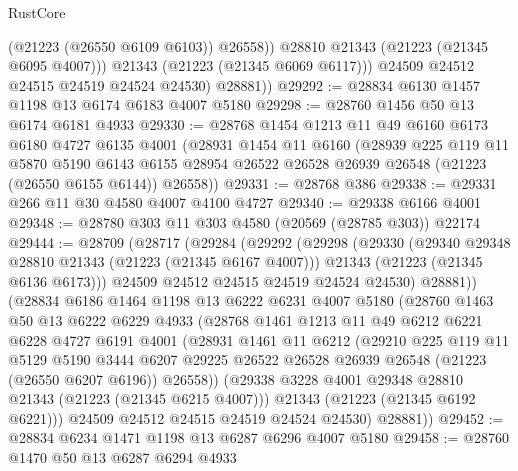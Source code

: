 \begin{lexlean}{RustCore}
\begin{coremodule}
                  (@21223 (@26550 @6109 @6103))
                  @26558))
              @28810
              @21343
              (@21223 (@21345 @6095 @4007)))
            @21343
            (@21223 (@21345 @6069 @6117)))
          @24509
          @24512
          @24515
          @24519
          @24524
          @24530)
        @28881))
@29292 := @28834 @6130 @1457 @1198 @13 @6174 @6183 @4007 @5180
@29298 := @28760 @1456 @50 @13 @6174 @6181 @4933
@29330 := @28768
    @1454
    @1213
    @11
    @49
    @6160
    @6173
    @6180
    @4727
    @6135
    @4001
    (@28931
      @1454
      @11
      @6160
      (@28939
        @225
        @119
        @11
        @5870
        @5190
        @6143
        @6155
        @28954
        @26522
        @26528
        @26939
        @26548
        (@21223 (@26550 @6155 @6144))
        @26558))
@29331 := @28768 @386
@29338 := @29331 @266 @11 @30 @4580 @4007 @4100 @4727
@29340 := @29338 @6166 @4001
@29348 := @28780 @303 @11 @303 @4580 (@20569 (@28785 @303)) @22174
@29444 := @28709
    (@28717
      (@29284
        (@29292
          (@29298
            (@29330
              (@29340 @29348 @28810 @21343 (@21223 (@21345 @6167 @4007)))
              @21343
              (@21223 (@21345 @6136 @6173)))
            @24509
            @24512
            @24515
            @24519
            @24524
            @24530)
          @28881))
      (@28834
        @6186
        @1464
        @1198
        @13
        @6222
        @6231
        @4007
        @5180
        (@28760
          @1463
          @50
          @13
          @6222
          @6229
          @4933
          (@28768
            @1461
            @1213
            @11
            @49
            @6212
            @6221
            @6228
            @4727
            @6191
            @4001
            (@28931
              @1461
              @11
              @6212
              (@29210
                @225
                @119
                @11
                @5129
                @5190
                @3444
                @6207
                @29225
                @26522
                @26528
                @26939
                @26548
                (@21223 (@26550 @6207 @6196))
                @26558))
            (@29338 @3228 @4001 @29348 @28810 @21343 (@21223 (@21345 @6215 @4007)))
            @21343
            (@21223 (@21345 @6192 @6221)))
          @24509
          @24512
          @24515
          @24519
          @24524
          @24530)
        @28881))
@29452 := @28834 @6234 @1471 @1198 @13 @6287 @6296 @4007 @5180
@29458 := @28760 @1470 @50 @13 @6287 @6294 @4933

\end{coremodule}
\end{lexlean}
